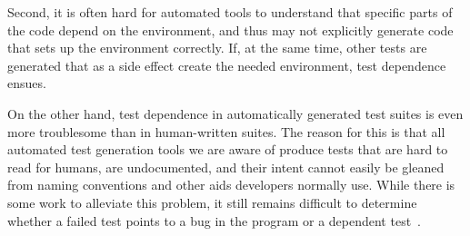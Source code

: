 

Second, it is often hard for automated tools to understand that
specific parts of the code depend on the environment, and thus may not
explicitly generate code that sets up the environment correctly. If,
at the same time, other tests are generated that as a side effect
create the needed environment, test dependence ensues.





On the other hand, test dependence in automatically generated test suites is 
even more troublesome than in human-written suites. The reason for this is
that all automated test generation tools we are aware of produce tests
that are hard to read for humans, are undocumented, and their intent
cannot easily be gleaned from naming conventions and other aids
developers normally use. While there is some work to alleviate this problem, it
still remains difficult to determine whether a failed test points to a bug
in the program or a dependent test~\cite{fraseretal:ISSTA:2011}.

